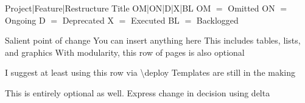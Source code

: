 \documentclass{article}
\begin{document}
\frontmatter
{Project|Feature|Restructure} 
{Title}
{OM|ON|D|X|BL}
{\hfill OM $=$ Omitted \hfill ON $=$ Ongoing \hfill D $=$ Deprecated \hfill X $=$ Executed \hfill BL $=$ Backlogged}

\strategy
{Salient point of change}
{You can insert anything here}
{This includes tables, lists, and graphics}
{With modularity, this row of pages is also optional}

\deploy
{I suggest at least using this row via {\textbackslash}deploy}
{Templates are still in the making}

\report
{This is entirely optional as well. Express change in decision using {\Delta}delta}

\end{document}
